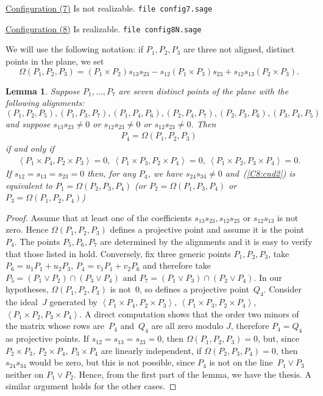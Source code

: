 \documentclass{amsart}
\theoremstyle{plain}
\newtheorem{lemma}{Lemma}[section]
\theoremstyle{definition}
\newcommand{\scl}[2]{\left\langle {#1}, {#2} \right\rangle}
\begin{document}
\underline{Configuration (7)} Is not realizable.
\verb+file config7.sage+



\underline{Configuration (8)} Is realizable.
\verb+file config8N.sage+

We will use the following notation:
if $P_1, P_2, P_3$ are three not aligned, distinct points in the plane,
we set
%
\[
  \Omega(P_1, P_2, P_3) = (P_1 \times P_2)s_{13}s_{23} -
  s_{12}(P_1 \times P_3)s_{23} + s_{12}s_{13}(P_2 \times P_3).
\]
%

\begin{lemma}
Suppose $P_1, \dots, P_7$ are seven distinct points of the plane with the
following alignments:
%
\begin{equation}
\label{C8_alignments}
  (P_1, P_2, P_5), (P_1, P_3, P_7),
  (P_1, P_4, P_6), (P_2, P_4, P_7),
  (P_2, P_3, P_6),(P_3, P_4, P_5)
\end{equation}
%
and suppose $s_{13}s_{23} \not = 0$ or $s_{12}s_{23} \not = 0$ or
$s_{12}s_{23} \not = 0$.
Then
%
\begin{gather}
\label{C8:cnd1}
  P_4 = \Omega(P_1, P_2, P_3)
\end{gather}
%
if and only if
%
\begin{gather}
\label{C8:cnd2}
  \scl{P_1\times P_4}{P_2 \times P_3} = 0,\
  \scl{P_1\times P_3}{P_2 \times P_4} = 0,\
  \scl{P_1\times P_2}{P_3 \times P_4} = 0.
\end{gather}
%
If $s_{12} = s_{13} = s_{23} = 0$ then, for any $P_4$, we have
$s_{24} s_{34} \not = 0$ and~(\ref{C8:cnd2}) is equivalent to
$P_1 = \Omega(P_2, P_3, P_4)$ (or $P_2 = \Omega(P_1, P_3, P_4)$
or $P_3 = \Omega(P_1, P_2, P_4)$)
\end{lemma}
\begin{proof}
Assume that at least one of the coefficients $s_{13}s_{23}, s_{12}s_{23}$
or $s_{12}s_{13}$ is not zero. Hence $\Omega(P_1, P_2, P_3)$ defines a
projective point and assume it is the point $P_4$. The points $P_5, P_6, P_7$
are determined by the alignments and it is easy to verify
that those listed in \Cref{C8_alignments} hold.
Conversely, fix three generic points $P_1, P_2, P_3$, take
$P_6 = u_1P_1+u_2P_3$, $P_4 = v_1P_1+v_2P_6$ and therefore take
$P_5 = (P_1 \vee P_2) \cap (P_3 \vee P_4)$ and $P_7 = (P_1 \vee P_3) \cap (P_2 \vee P_4)$.
In our hypotheses, $\Omega(P_1, P_2, P_3)$ is not~$0$,
so defines a projective point~$Q_4$. Consider the ideal~$J$ generated
by $\scl{P_1\times P_4}{P_2\times P_3}$,
$\scl{P_1\times P_3}{P_2\times P_4}$,
$\scl{P_1\times P_2}{P_3\times P_4}$. A direct computation shows that
the order two minors of the matrix whose rows are~$P_4$ and~$Q_4$ are all
zero modulo $J$, therefore $P_4 = Q_4$ as projective points.
If $s_{12} = s_{13} = s_{23} = 0$, then $\Omega(P_1, P_2, P_3) = 0$,
but, since $P_2 \times P_3$, $P_2 \times P_4$, $P_3 \times P_4$ are linearly
independent, if $\Omega(P_2, P_3, P_4) = 0$, then $s_{24}s_{34}$ would be
zero, but this is not possible, since $P_4$ is not on the line~$P_1 \vee P_3$
neither on $P_1\vee P_2$. Hence, from the first part of the lemma, we have the
thesis. A similar argument holds for the other cases.
\end{proof}
\end{document}
